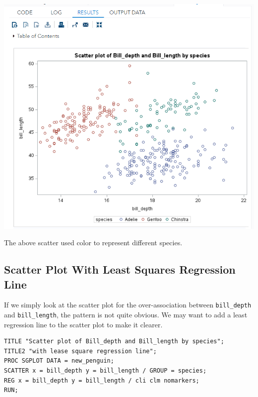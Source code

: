 \documentclass[
]{book}
\begin{document}
\begin{center}\includegraphics[width=1\linewidth]{img06/w06-BasicScatterPlot} \end{center}

The above scatter used color to represent different species.

\hypertarget{scatter-plot-with-least-squares-regression-line}{%
\subsection{Scatter Plot With Least Squares Regression Line}\label{scatter-plot-with-least-squares-regression-line}}

If we simply look at the scatter plot for the over-association between \texttt{bill\_depth} and \texttt{bill\_length}, the pattern is not quite obvious. We may want to add a least regression line to the scatter plot to make it clearer.

\begin{verbatim}
TITLE "Scatter plot of Bill_depth and Bill_length by species";
TITLE2 "with lease square regression line";
PROC SGPLOT DATA = new_penguin;
SCATTER x = bill_depth y = bill_length / GROUP = species;
REG x = bill_depth y = bill_length / cli clm nomarkers;
RUN;
\end{verbatim}
\end{document}
